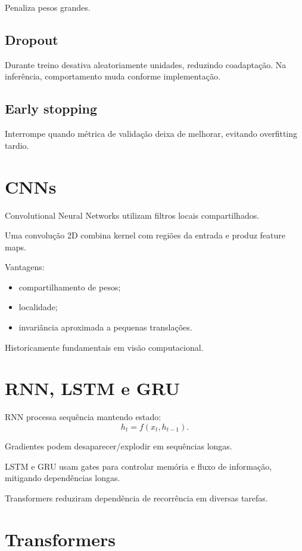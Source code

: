 Penaliza pesos grandes.

\subsection{Dropout}

Durante treino desativa aleatoriamente unidades, reduzindo coadaptação. Na inferência, comportamento muda conforme implementação.

\subsection{Early stopping}

Interrompe quando métrica de validação deixa de melhorar, evitando overfitting tardio.

\section{CNNs}

Convolutional Neural Networks utilizam filtros locais compartilhados.

Uma convolução 2D combina kernel com regiões da entrada e produz feature maps.

Vantagens:
\begin{itemize}
\item compartilhamento de pesos;
\item localidade;
\item invariância aproximada a pequenas translações.
\end{itemize}

Historicamente fundamentais em visão computacional.

\section{RNN, LSTM e GRU}

RNN processa sequência mantendo estado:
\[
h_t=f(x_t,h_{t-1}).
\]

Gradientes podem desaparecer/explodir em sequências longas.

LSTM e GRU usam gates para controlar memória e fluxo de informação, mitigando dependências longas.

Transformers reduziram dependência de recorrência em diversas tarefas.

\section{Transformers}

